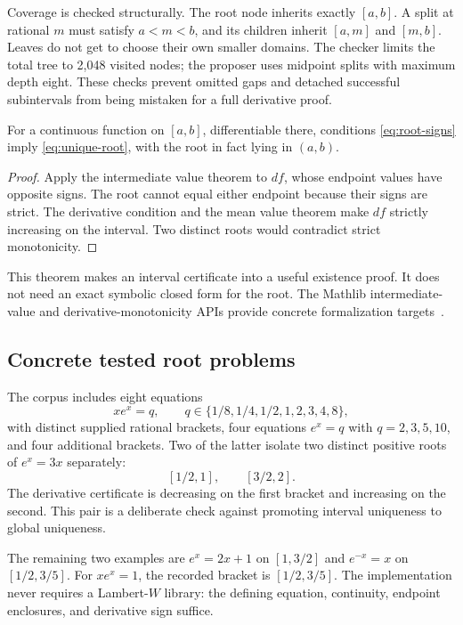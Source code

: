 Coverage is checked structurally. The root node inherits exactly $[a,b]$. A split at rational $m$ must satisfy $a<m<b$, and its children inherit $[a,m]$ and $[m,b]$. Leaves do not get to choose their own smaller domains. The checker limits the total tree to 2,048 visited nodes; the proposer uses midpoint splits with maximum depth eight. These checks prevent omitted gaps and detached successful subintervals from being mistaken for a full derivative proof.

\begin{theorem}
\label{thm:root}
For a continuous function on $[a,b]$, differentiable there, conditions \eqref{eq:root-signs} imply \eqref{eq:unique-root}, with the root in fact lying in $(a,b)$.
\end{theorem}
\begin{proof}
Apply the intermediate value theorem to $df$, whose endpoint values have opposite signs. The root cannot equal either endpoint because their signs are strict. The derivative condition and the mean value theorem make $df$ strictly increasing on the interval. Two distinct roots would contradict strict monotonicity.
\end{proof}

This theorem makes an interval certificate into a useful existence proof. It does not need an exact symbolic closed form for the root. The Mathlib intermediate-value and derivative-monotonicity APIs provide concrete formalization targets~\cite{mathlib-ivt,mathlib-mvt}.

\subsection{Concrete tested root problems}

The corpus includes eight equations
\[
 xe^x=q,\qquad q\in\{1/8,1/4,1/2,1,2,3,4,8\},
\]
with distinct supplied rational brackets, four equations $e^x=q$ with $q=2,3,5,10$, and four additional brackets. Two of the latter isolate two distinct positive roots of $e^x=3x$ separately:
\[
 [1/2,1],\qquad [3/2,2].
\]
The derivative certificate is decreasing on the first bracket and increasing on the second. This pair is a deliberate check against promoting interval uniqueness to global uniqueness.

The remaining two examples are $e^x=2x+1$ on $[1,3/2]$ and $e^{-x}=x$ on $[1/2,3/5]$. For $xe^x=1$, the recorded bracket is $[1/2,3/5]$. The implementation never requires a Lambert-$W$ library: the defining equation, continuity, endpoint enclosures, and derivative sign suffice.

